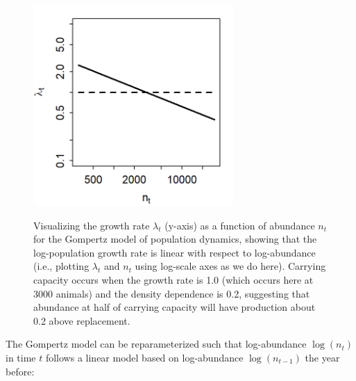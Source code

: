 \begin{figure}[!ht]
    \caption[Gompertz model for population dynamics]{Visualizing the growth rate \(\lambda_t\) (y-axis) as a function of abundance \(n_t\) for the Gompertz model of population dynamics, showing that the log-population growth rate is linear with respect to log-abundance (i.e., plotting \(\lambda_t\) and \(n_t\) using log-scale axes as we do here).  Carrying capacity occurs when the growth rate is 1.0 (which occurs here at 3000 animals) and the density dependence is 0.2, suggesting that abundance at half of carrying capacity will have production about 0.2 above replacement.}
    \centering
    \includegraphics[width=3in]{Chap_3/Gompertz_production.png}
    \label{fig:Chap3_gompertz_production}
\end{figure}

The Gompertz model can be reparameterized such that log-abundance \( \log(n_t) \) in time \(t\) follows a linear model based on log-abundance \( \log(n_{t-1}) \) the year before:

